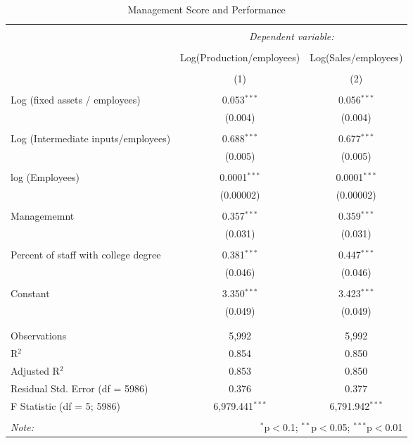 \documentclass[]{article}
\begin{document}
\begin{table}[!htbp] \centering 
  \caption{Management Score and Performance} 
  \label{} 
\begin{tabular}{@{\extracolsep{5pt}}lcc} 
\\[-1.8ex]\hline 
\hline \\[-1.8ex] 
 & \multicolumn{2}{c}{\textit{Dependent variable:}} \\ 
\cline{2-3} 
\\[-1.8ex] & Log(Production/employees) & Log(Sales/employees) \\ 
\\[-1.8ex] & (1) & (2)\\ 
\hline \\[-1.8ex] 
 Log (fixed assets / employees) & 0.053$^{***}$ & 0.056$^{***}$ \\ 
  & (0.004) & (0.004) \\ 
  & & \\ 
 Log (Intermediate inputs/employees) & 0.688$^{***}$ & 0.677$^{***}$ \\ 
  & (0.005) & (0.005) \\ 
  & & \\ 
 log (Employees) & 0.0001$^{***}$ & 0.0001$^{***}$ \\ 
  & (0.00002) & (0.00002) \\ 
  & & \\ 
 Managememnt & 0.357$^{***}$ & 0.359$^{***}$ \\ 
  & (0.031) & (0.031) \\ 
  & & \\ 
 Percent of staff with college degree & 0.381$^{***}$ & 0.447$^{***}$ \\ 
  & (0.046) & (0.046) \\ 
  & & \\ 
 Constant & 3.350$^{***}$ & 3.423$^{***}$ \\ 
  & (0.049) & (0.049) \\ 
  & & \\ 
\hline \\[-1.8ex] 
Observations & 5,992 & 5,992 \\ 
R$^{2}$ & 0.854 & 0.850 \\ 
Adjusted R$^{2}$ & 0.853 & 0.850 \\ 
Residual Std. Error (df = 5986) & 0.376 & 0.377 \\ 
F Statistic (df = 5; 5986) & 6,979.441$^{***}$ & 6,791.942$^{***}$ \\ 
\hline 
\hline \\[-1.8ex] 
\textit{Note:}  & \multicolumn{2}{r}{$^{*}$p$<$0.1; $^{**}$p$<$0.05; $^{***}$p$<$0.01} \\ 
\end{tabular} 
\end{table}
\end{document}
